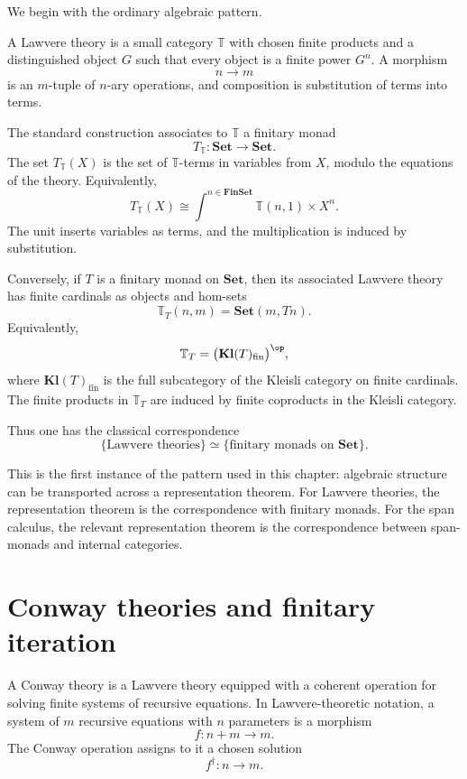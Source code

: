 We begin with the ordinary algebraic pattern.

A Lawvere theory is a small category \(\mathbb T\) with chosen finite products
and a distinguished object \(G\) such that every object is a finite power
\(G^n\).  A morphism
\[
n\to m
\]
is an \(m\)-tuple of \(n\)-ary operations, and composition is substitution of
terms into terms.

The standard construction associates to \(\mathbb T\) a finitary monad
\[
T_{\mathbb T}:\mathbf{Set}\to\mathbf{Set}.
\]
The set \(T_{\mathbb T}(X)\) is the set of \(\mathbb T\)-terms in variables
from \(X\), modulo the equations of the theory.  Equivalently,
\[
T_{\mathbb T}(X)
\cong
\int^{n\in\mathbf{FinSet}}
\mathbb T(n,1)\times X^n.
\]
The unit inserts variables as terms, and the multiplication is induced by
substitution.

Conversely, if \(T\) is a finitary monad on \(\mathbf{Set}\), then its
associated Lawvere theory has finite cardinals as objects and hom-sets
\[
\mathbb T_T(n,m)
=
\mathbf{Set}(m,Tn).
\]
Equivalently,
\[
\mathbb T_T
=
\bigl(\mathbf{Kl}(T)_{\mathrm{fin}}\bigr)^{\op},
\]
where \(\mathbf{Kl}(T)_{\mathrm{fin}}\) is the full subcategory of the
Kleisli category on finite cardinals.  The finite products in
\(\mathbb T_T\) are induced by finite coproducts in the Kleisli category.

Thus one has the classical correspondence
\[
\boxed{
\{\text{Lawvere theories}\}
\simeq
\{\text{finitary monads on }\mathbf{Set}\}.
}
\]

This is the first instance of the pattern used in this chapter: algebraic
structure can be transported across a representation theorem.  For Lawvere
theories, the representation theorem is the correspondence with finitary
monads.  For the span calculus, the relevant representation theorem is the
correspondence between span-monads and internal categories.

\section{Conway theories and finitary iteration}
\label{sec:conway-theories-finitary-iteration}

A Conway theory is a Lawvere theory equipped with a coherent operation for
solving finite systems of recursive equations.  In Lawvere-theoretic notation,
a system of \(m\) recursive equations with \(n\) parameters is a morphism
\[
f:n+m\to m.
\]
The Conway operation assigns to it a chosen solution
\[
f^\dagger:n\to m.
\]

